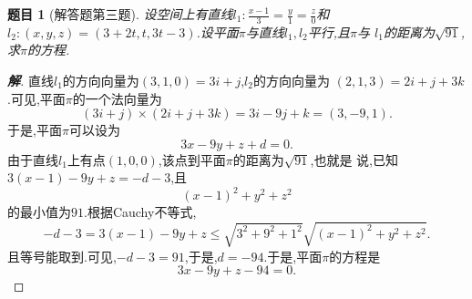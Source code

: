 ﻿\documentclass[a3paper]{article}
\newtheorem*{exe}{题目}
\newenvironment{exercise}
{\bigskip\begin{mdframed}\begin{exe}}
    {\end{exe}\end{mdframed}\bigskip}
\numberwithin{equation}{section}
\begin{document}
\begin{exercise}[解答题第三题]
  设空间上有直线$l_1:\frac{x-1}{3}=\frac{y}{1}=\frac{z}{0}$和
  $l_2:(x,y,z)=(3+2t,t,3t-3)$.设平面$\pi$与直线$l_1,l_2$平行,且$\pi$与
  $l_1$的距离为$\sqrt{91}$,求$\pi$的方程.
\end{exercise}
\begin{proof}[\textbf{解}]
直线$l_1$的方向向量为$(3,1,0)=3i+j$,$l_2$的方向向量为
$(2,1,3)=2i+j+3k$.可见,平面$\pi$的一个法向量为
$$
(3i+j)\times (2i+j+3k)=3i-9j+k=(3,-9,1).
$$
于是,平面$\pi$可以设为
$$
3x-9y+z+d=0.
$$
由于直线$l_1$上有点$(1,0,0)$,该点到平面$\pi$的距离为$\sqrt{91}$,也就是
说,已知$3(x-1)-9y+z=-d-3$,且
$$
(x-1)^2+y^2+z^2
$$
的最小值为$91$.根据Cauchy不等式,
$$
-d-3=3(x-1)-9y+z\leq \sqrt{3^2+9^2+1^2}\sqrt{(x-1)^2+y^2+z^2}.
$$
且等号能取到.可见,$-d-3=91$,于是,$d=-94$.于是,平面$\pi$的方程是
$$
3x-9y+z-94=0.
$$
\end{proof}
\end{document}
